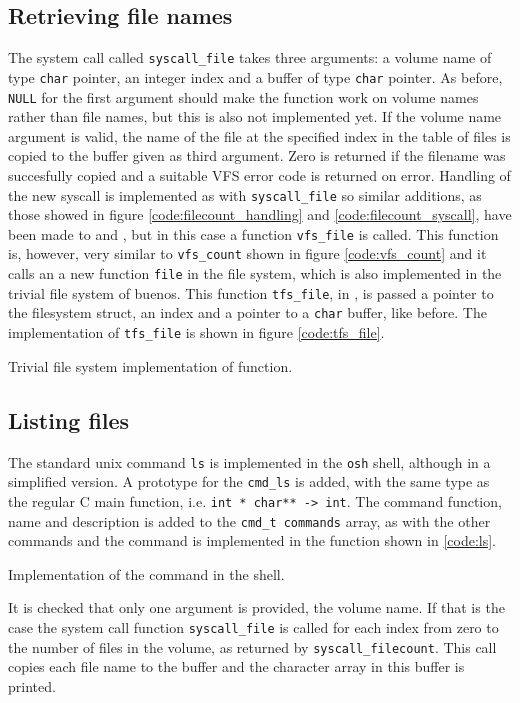 \subsection{Retrieving file names}
The system call called \verb|syscall_file| takes three arguments: a volume name
of type \verb|char| pointer, an integer index and a buffer of type \verb|char|
pointer. As before, \verb|NULL| for the first argument should make the function
work on volume names rather than file names, but this is also not implemented
yet. If the volume name argument is valid, the name of the file at the
specified index in the table of files is copied to the buffer given as third
argument. Zero is returned if the filename was succesfully copied and a
suitable VFS error code is returned on error.  Handling of the new syscall is
implemented as with \verb|syscall_file| so similar additions, as those showed in
figure \ref{code:filecount_handling} and \ref{code:filecount_syscall}, have
been made to  and , but in
this case a function \verb|vfs_file| is called. This function is, however, very
similar to \verb|vfs_count| shown in figure \ref{code:vfs_count} and it calls
an a new function \verb|file| in the file system, which is also implemented in
the trivial file system of buenos. This function \verb|tfs_file|, in
, is passed a pointer to the filesystem struct, an index and a
pointer to a \verb|char| buffer, like before. The implementation of
\verb|tfs_file| is shown in figure \ref{code:tfs_file}.

        {Trivial file system implementation of  function.}


\subsection{Listing files}
The standard unix command \verb|ls| is implemented in the \verb|osh| shell,
although in a simplified version. A prototype for the \verb|cmd_ls| is added,
with the same type as the regular C main function, i.e. \verb|int * char** -> int|.
The command function, name and description is added to the \verb|cmd_t commands|
array, as with the other commands and the command is implemented in the
function shown in \ref{code:ls}.

        {Implementation of the command  in the  shell.}

It is checked that only one argument is provided, the volume name. If that is
the case the system call function \verb|syscall_file| is called for each index
from zero to the number of files in the volume, as returned by
\verb|syscall_filecount|. This call copies each file name to the buffer and the
character array in this buffer is printed.
